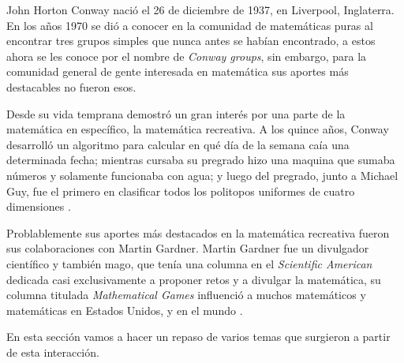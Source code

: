 John Horton Conway naci\'o el 26 de diciembre de 1937, en Liverpool, Inglaterra. En los a\~nos 1970 se di\'o a conocer en la comunidad de matem\'aticas puras al encontrar tres grupos simples que nunca antes se hab\'ian encontrado, a estos ahora se les conoce por el nombre de \textit{Conway groups}, sin embargo, para la comunidad general de gente interesada en matem\'atica sus aportes m\'as destacables no fueron esos.

Desde su vida temprana demostr\'o un gran inter\'es por una parte de la matem\'atica en espec\'ifico, la matem\'atica recreativa. A los quince años, Conway desarroll\'o un algoritmo para calcular en qué día de la semana caía una determinada fecha; mientras cursaba su pregrado hizo una maquina que sumaba n\'umeros y solamente funcionaba con agua; y luego del pregrado, junto a Michael Guy, fue el primero en clasificar todos los politopos uniformes de cuatro dimensiones \cite{Roberts2015-ur}.

Problablemente sus aportes m\'as destacados en la matem\'atica recreativa fueron sus colaboraciones con Martin Gardner. Martin Gardner fue un divulgador cient\'ifico y tambi\'en mago, que ten\'ia una columna en el \textit{Scientific American} dedicada casi exclusivamente a proponer retos y a divulgar la matem\'atica, su columna titulada \textit{Mathematical Games} influenci\'o a muchos matem\'aticos y matem\'aticas en Estados Unidos, y en el mundo \cite{Gardner1999}.

En esta secci\'on vamos a hacer un repaso de varios temas que surgieron a partir de esta interacci\'on.